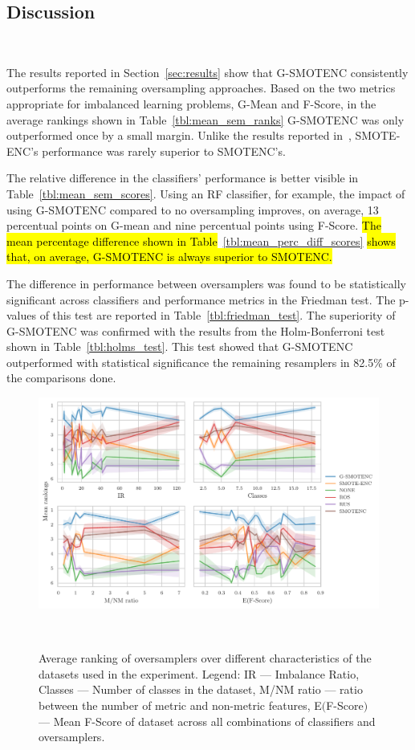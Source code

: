 \documentclass[preprint,12pt]{elsarticle}
\begin{document}
{\subsection{Discussion}~\label{sec:discussion}

The results reported in Section~\ref{sec:results} show that G-SMOTENC
consistently outperforms the remaining oversampling approaches. Based on the
two metrics appropriate for imbalanced learning problems, G-Mean and F-Score,
in the average rankings shown in Table~\ref{tbl:mean_sem_ranks} G-SMOTENC was
only outperformed once by a small margin. Unlike the results reported
in~\cite{mukherjee2021smote}, SMOTE-ENC's performance was rarely superior to
SMOTENC's.

The relative difference in the classifiers' performance is better visible in
Table~\ref{tbl:mean_sem_scores}. Using an RF classifier, for example, the
impact of using G-SMOTENC compared to no oversampling improves, on average, 13
percentual points on G-mean and nine percentual points using F-Score. \hl{The
mean percentage difference shown in
Table}~\ref{tbl:mean_perc_diff_scores}\hl{ shows that, on average, G-SMOTENC
is always superior to SMOTENC.}

The difference in performance between oversamplers was found to be
statistically significant across classifiers and performance metrics in the
Friedman test. The p-values of this test are reported in
Table~\ref{tbl:friedman_test}. The superiority of G-SMOTENC was confirmed with
the results from the Holm-Bonferroni test shown in Table~\ref{tbl:holms_test}.
This test showed that G-SMOTENC outperformed with statistical significance the
remaining resamplers in 82.5\% of the comparisons done.

\begin{figure}[ht]
	\centering
	\includegraphics[width=\linewidth]{../analysis/consistency_analysis_plot}
    \caption{Average ranking of oversamplers over different characteristics of
        the datasets used in the experiment. Legend: IR --- Imbalance Ratio,
        Classes --- Number of classes in the dataset, M/NM ratio --- ratio
        between the number of metric and non-metric features, E$($F-Score$)$
        --- Mean F-Score of dataset across all combinations of classifiers and
        oversamplers.
    }~\label{fig:consistency_analysis}
\end{figure}


}
\end{document}
